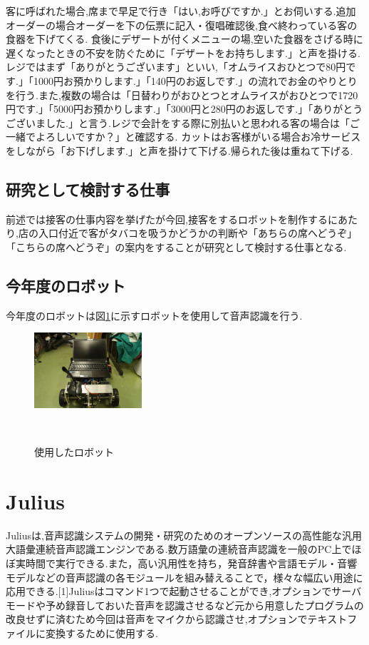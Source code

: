 \documentclass[a4paper]{jarticle}
\begin{document}
客に呼ばれた場合,席まで早足で行き「はい,お呼びですか.」とお伺いする.追加オーダーの場合オーダーを下の伝票に記入・復唱確認後,食べ終わっている客の食器を下げてくる.
食後にデザートが付くメニューの場,空いた食器をさげる時に遅くなったときの不安を防ぐために「デザートをお持ちします.」と声を掛ける.
レジではまず「ありがとうございます」といい,「オムライスおひとつで80円です.」「1000円お預かりします.」「140円のお返しです.」の流れでお金のやりとりを行う.また,複数の場合は「日替わりがおひとつとオムライスがおひとつで1720円です.」「5000円お預かりします.」「3000円と280円のお返しです.」「ありがとうございました.」と言う.レジで会計をする際に別払いと思われる客の場合は「ご一緒でよろしいですか？」と確認する.
カットはお客様がいる場合お冷サービスをしながら「お下げします.」と声を掛けて下げる.帰られた後は重ねて下げる.


\subsection{研究として検討する仕事}
前述では接客の仕事内容を挙げたが今回,接客をするロボットを制作するにあたり,店の入口付近で客がタバコを吸うかどうかの判断や「あちらの席へどうぞ」「こちらの席へどうぞ」の案内をすることが研究として検討する仕事となる.


\subsection{今年度のロボット}
今年度のロボットは図\ref{fig:robot}に示すロボットを使用して音声認識を行う.


\begin{figure}[h]
 \begin{center}
  \includegraphics[width=40mm]{img/robo.png}
 　\caption{使用したロボット}
 　\label{fig:robot}
 \end{center}
\end{figure}


\section{Julius}
Juliusは,音声認識システムの開発・研究のためのオープンソースの高性能な汎用大語彙連続音声認識エンジンである.数万語彙の連続音声認識を一般のPC上でほぼ実時間で実行できる.また，高い汎用性を持ち，発音辞書や言語モデル・音響モデルなどの音声認識の各モジュールを組み替えることで，様々な幅広い用途に応用できる.[1]Juliusはコマンド1つで起動させることができ,オプションでサーバモードや予め録音しておいた音声を認識させるなど元から用意したプログラムの改良せずに済むため今回は音声をマイクから認識させ,オプションでテキストファイルに変換するために使用する.
\end{document}
